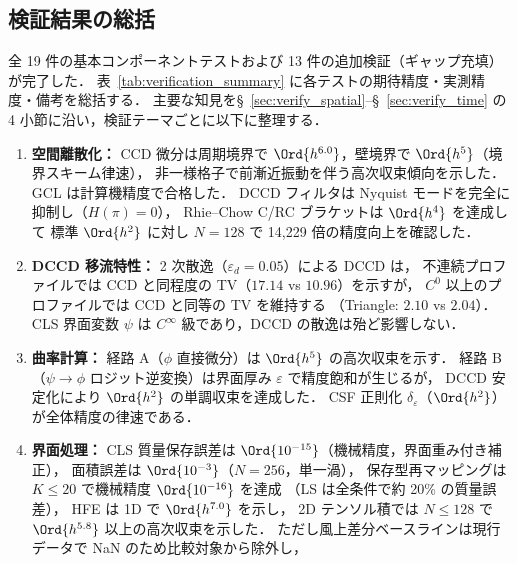 %
\subsection{検証結果の総括}
\label{sec:verify_summary}

全 19 件の基本コンポーネントテストおよび 13 件の追加検証（ギャップ充填）が完了した．
表~\ref{tab:verification_summary} に各テストの期待精度・実測精度・備考を総括する．
主要な知見を§~\ref{sec:verify_spatial}--§~\ref{sec:verify_time} の 4 小節に沿い，検証テーマごとに以下に整理する．

\begin{enumerate}
  \item \textbf{空間離散化：}
        CCD 微分は周期境界で $\Ord{h^{6.0}}$，壁境界で $\Ord{h^5}$（境界スキーム律速），
        非一様格子で前漸近振動を伴う高次収束傾向を示した．
        GCL は計算機精度で合格した．
        DCCD フィルタは Nyquist モードを完全に抑制し（$H(\pi)=0$），
        Rhie--Chow C/RC ブラケットは $\Ord{h^4}$ を達成して
        標準 $\Ord{h^2}$ に対し $N{=}128$ で 14{,}229 倍の精度向上を確認した．
  \item \textbf{DCCD 移流特性：}
        2 次散逸（$\varepsilon_d = 0.05$）による DCCD は，
        不連続プロファイルでは CCD と同程度の TV（$17.14$ vs $10.96$）を示すが，
        $C^0$ 以上のプロファイルでは CCD と同等の TV を維持する
        （Triangle: $2.10$ vs $2.04$）．
        CLS 界面変数 $\psi$ は $C^\infty$ 級であり，DCCD の散逸は殆ど影響しない．
  \item \textbf{曲率計算：}
        経路 A（$\phi$ 直接微分）は $\Ord{h^5}$ の高次収束を示す．
        経路 B（$\psi \to \phi$ ロジット逆変換）は界面厚み $\varepsilon$ で精度飽和が生じるが，
        DCCD 安定化により $\Ord{h^2}$ の単調収束を達成した．
        CSF 正則化 $\delta_\varepsilon$（$\Ord{h^2}$）が全体精度の律速である．
  \item \textbf{界面処理：}
        CLS 質量保存誤差は $\Ord{10^{-15}}$（機械精度，界面重み付き補正），
        面積誤差は $\Ord{10^{-3}}$（$N{=}256$，単一渦），
        保存型再マッピングは $K \leq 20$ で機械精度 $\Ord{10^{-16}}$ を達成
        （LS は全条件で約 20\% の質量誤差），
        HFE は 1D で $\Ord{h^{7.0}}$ を示し，
        2D テンソル積では $N\le128$ で $\Ord{h^{5.8}}$ 以上の高次収束を示した．
        ただし風上差分ベースラインは現行データで NaN のため比較対象から除外し，

\end{enumerate}

